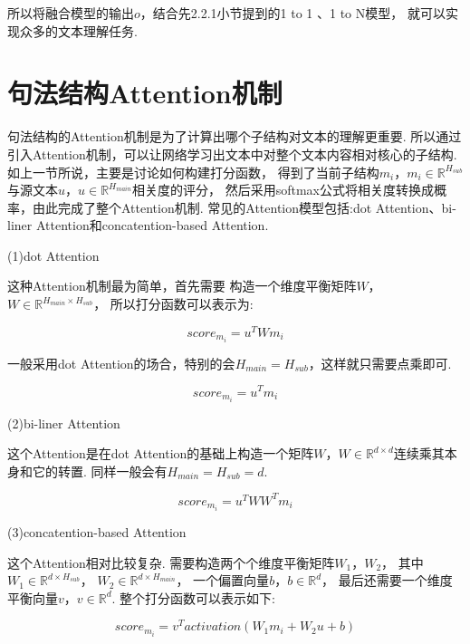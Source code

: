 \documentclass[bachelor,adobefonts]{jnuthesis}
\begin{document}
所以将融合模型的输出$o$，结合先2.2.1小节提到的1 to 1 、1 to N模型，
就可以实现众多的文本理解任务. 

\section{句法结构Attention机制}
句法结构的Attention机制是为了计算出哪个子结构对文本的理解更重要.
所以通过引入Attention机制，可以让网络学习出文本中对整个文本内容相对核心的子结构.
如上一节所说，主要是讨论如何构建打分函数，
得到了当前子结构$m_{i}$，$m_{i} \in \mathbb{R}^{H_{sub}}$与源文本$u$，$u \in \mathbb{R}^{H_{main}}$相关度的评分，
然后采用softmax公式将相关度转换成概率，由此完成了整个Attention机制.
常见的Attention模型包括:dot Attention、bi-liner Attention和concatention-based Attention.

(1)dot Attention

这种Attention机制最为简单，首先需要
构造一个维度平衡矩阵$W$，$W \in \mathbb{R}^{H_{main} \times H_{sub}}$，
所以打分函数可以表示为:

\begin{equation}
  score_{m_{i}} = u^{T}Wm_{i}
\end{equation}

一般采用dot Attention的场合，特别的会$H_{main} = H_{sub}$，这样就只需要点乘即可.

\begin{equation}
  score_{m_{i}} = u^{T}m_{i}
\end{equation}

(2)bi-liner Attention

这个Attention是在dot Attention的基础上构造一个矩阵$W$，$W \in \mathbb{R}^{d \times d}$连续乘其本身和它的转置.
同样一般会有$H_{main} = H_{sub} = d $.

\begin{equation}
  score_{m_{i}} = u^{T}WW^{T}m_{i}
\end{equation}


(3)concatention-based Attention

这个Attention相对比较复杂.
需要构造两个个维度平衡矩阵$W_{1}$，$W_{2}$，
其中$W_{1} \in \mathbb{R}^{d \times H_{sub}}$，
$W_{2} \in \mathbb{R}^{d \times H_{main}}$，
一个偏置向量$b$，$b \in \mathbb{R}^{d}$，
最后还需要一个维度平衡向量$v$，$v \in \mathbb{R}^{d}$.
整个打分函数可以表示如下:

\begin{equation}
  score_{m_{i}} = v^{T}activation(W_{1}m_{i}+W_{2}u+b)
\end{equation}
\end{document}
